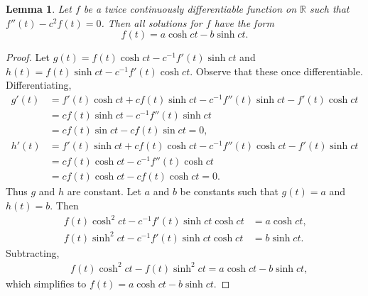 \documentclass[oneside]{article}
\newcommand\bbR{\mathbb{R}}
\newtheorem*{lem}{Lemma}
\begin{document}
\begin{lem} Let $f$ be a twice continuously differentiable function on $\bbR$
such that $f''(t) - c^2f(t) = 0$. Then all solutions for $f$ have the form\[
  f(t) = a\cosh ct - b\sinh ct \text{.}
\]
\end{lem}

\begin{proof}
Let $g(t) = f(t)\cosh ct - c^{-1} f'(t) \sinh ct$ and
$h(t) = f(t)\sinh ct - c^{-1} f'(t) \cosh ct$. Observe that these once
differentiable. Differentiating,
  \begin{align*}
    g'(t)
    &= f'(t)\cosh ct + cf(t)\sinh ct - c^{-1} f''(t) \sinh ct - f'(t) \cosh ct \\
    &= cf(t)\sinh ct - c^{-1} f''(t) \sinh ct \\
    &= cf(t)\sin ct - c f(t) \sin ct = 0\text{,} \\
    h'(t)
    &= f'(t)\sinh ct + cf(t)\cosh ct - c^{-1} f''(t) \cosh ct - f'(t) \sinh ct \\
    &= cf(t)\cosh ct - c^{-1} f''(t) \cosh ct \\
    &= cf(t)\cosh ct - cf(t) \cosh ct = 0\text{.}
  \end{align*} Thus $g$ and $h$ are constant. Let $a$ and $b$ be constants such
  that $g(t) = a$ and $h(t) = b$. Then \begin{align*}
    f(t)\cosh^2 ct - c^{-1} f'(t) \sinh ct\cosh ct &= a\cosh ct \text{,} \\
    f(t)\sinh^2 ct - c^{-1} f'(t) \sinh ct\cosh ct &= b\sinh ct \text{.}
  \end{align*}Subtracting,\begin{align*}
    &f(t)\cosh^2 ct - f(t)\sinh^2 ct = a\cosh ct - b\sinh ct \text{,}
  \end{align*} which simplifies to $f(t) = a\cosh ct - b\sinh ct$.
\end{proof}
\end{document}
